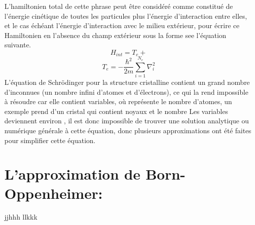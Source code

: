 L'hamiltonien total de cette phrase peut être considéré comme constitué de l'énergie cinétique de toutes les particules plus l'énergie d'interaction entre elles, et le cas échéant l'énergie d'interaction avec le milieu extérieur, pour écrire ce Hamiltonien en l'absence du champ extérieur sous la forme see l'équation suivante.
\begin{equation}\label{2-2}
	H_{int} = T_{e}+
\end{equation}
\begin{equation}\label{key}
	T_{e}= -\dfrac{\hbar^{2}}{2m}\sum_{i=1}^{N_{e}}\nabla_{i}^{2}
\end{equation}
L'équation de Schrödinger pour la structure cristalline contient un grand nombre d'inconnues (un nombre infini d'atomes et d'électrons), ce qui la rend impossible à résoudre car elle contient  variables, où  représente le nombre d'atomes, un exemple prend  d'un cristal qui contient  noyaux et le nombre Les variables deviennent environ , il est donc impossible de trouver une solution analytique ou numérique générale à cette équation, donc plusieurs approximations ont été faites pour simplifier cette équation.
\section{L’approximation de Born-Oppenheimer:}

jjhhh
llkkk
